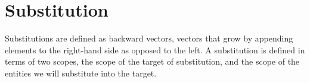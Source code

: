 \section{Substitution}




Substitutions are defined as backward vectors, vectors that grow by appending
elements to the right-hand side as opposed to the left. A substitution is
defined in terms of two scopes, the scope of the target of substitution, and
the scope of the entities we will substitute into the target.

\begin{code}%
\>[0]\AgdaSpace{}%
\AgdaSymbol{:}\AgdaSpace{}%
\AgdaSpace{}%
\AgdaSpace{}%
\AgdaSpace{}%
\AgdaSpace{}%
\AgdaSpace{}%
\AgdaSpace{}%
\<%
\\
\>[0]\AgdaSpace{}%
\AgdaOperator{\AgdaFunction{⇒[}}\AgdaSpace{}%
\AgdaSpace{}%
\AgdaOperator{\AgdaFunction{]}}\AgdaSpace{}%
\AgdaSpace{}%
\AgdaSymbol{=}\AgdaSpace{}%
\AgdaSpace{}%
\AgdaSymbol{(}\AgdaSpace{}%
\AgdaSymbol{)}\AgdaSpace{}%
\<%
\end{code}

